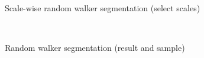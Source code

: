 \begin{figure}[p] \centering
  \\[-0.5cm]
  \\[-0.5cm]
  \\[-0.5cm]
  \caption{Scale-wise random walker segmentation (select scales)}
  \label{fig:rw-demo-scalewise}
\end{figure}


\begin{figure} \centering
  \\
  \caption{Random walker segmentation (result and sample)}
  \label{fig:rw-demo-merged}
\end{figure}

%


